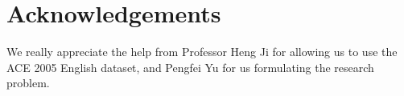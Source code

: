 \documentclass[11pt]{article}
\begin{document}
\section{Acknowledgements}
We really appreciate the help from Professor Heng Ji for allowing us to use the ACE 2005 English dataset, and Pengfei Yu for us formulating the research problem. 

\nocite{Ando2005,borschinger-johnson-2011-particle,andrew2007scalable,rasooli-tetrault-2015,goodman-etal-2016-noise,harper-2014-learning}


\appendix
\end{document}
